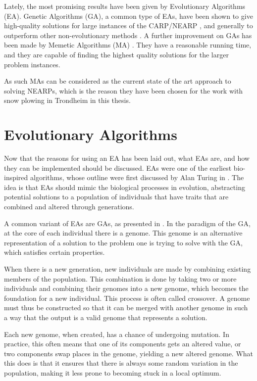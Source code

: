 Lately, the most promising results have been given by Evolutionary Algorithms (EA). Genetic Algorithms (GA), a common type of EAs, have been shown to give high-quality solutions for large instances of the CARP/NEARP \citep{lacomme2001GA}, and generally to outperform other non-evolutionary methods \citep{wohlk2008decade}. A further improvement on GAs has been made by Memetic Algorithms (MA) \citep{prins2005memeticNEARP}. They have a reasonable running time, and they are capable of finding the highest quality solutions for the larger problem instances.

As such MAs can be considered as the current state of the art approach to solving NEARPs, which is the reason they have been chosen for the work with snow plowing in Trondheim in this thesis.



\section{Evolutionary Algorithms} %
\label{sec:evolutionary_algorithms}
Now that the reasons for using an EA has been laid out, what EAs are, and how they can be implemented should be discussed. EAs were one of the earliest bio-inspired algorithms, whose outline were first discussed by Alan Turing in \citet{turing1950computing}. The idea is that EAs should mimic the biological processes in evolution, abstracting potential solutions to a population of individuals that have traits that are combined and altered through generations.

A common variant of EAs are GAs, as presented in \citet{holland1975originalGA}. In the paradigm of the GA, at the core of each individual there is a genome. This genome is an alternative representation of a solution to the problem one is trying to solve with the GA, which satisfies certain properties.

When there is a new generation, new individuals are made by combining existing members of the population. This combination is done by taking two or more individuals and combining their genomes into a new genome, which becomes the foundation for a new individual. This process is often called crossover. A genome must thus be constructed so that it can be merged with another genome in such a way that the output is a valid genome that represents a solution.

Each new genome, when created, has a chance of undergoing mutation. In practice, this often means that one of its components gets an altered value, or two components swap places in the genome, yielding a new altered genome. What this does is that it ensures that there is always some random variation in the population, making it less prone to becoming stuck in a local optimum.

